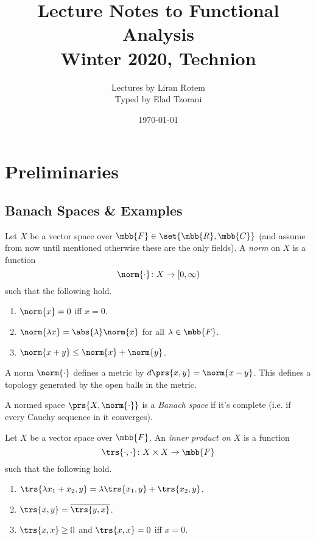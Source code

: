\documentclass[10pt, twoside]{book}
\title{Lecture Notes to Functional Analysis \\ \large{Winter 2020, Technion}}
\author{Lectures by Liran Rotem \\ \small{Typed by Elad Tzorani}}
\date{\today}
\begin{document}
\maketitle
\tableofcontents

\chapter{Preliminaries}

\section{Banach Spaces \& Examples}

\begin{definition}[Norm]
Let $X$ be a vector space over $\mbb{F} \in \set{\mbb{R}, \mbb{C}}$ (and assume from now until mentioned otherwise these are the only fields).
A \emph{norm} on $X$ is a function
\[\norm{\cdot} \colon X \to \left[0, \infty \right)\]
such that the following hold.
\begin{enumerate}
\item $\norm{x} = 0$ iff $x = 0$.
\item $\norm{\lambda x} = \abs{\lambda} \norm{x}$ for all $\lambda \in \mbb{F}$.
\item $\norm{x+y} \leq \norm{x} + \norm{y}$.
\end{enumerate}
\end{definition}

\begin{remark}
A norm $\norm{\cdot}$ defines a metric by $d\prs{x,y} = \norm{x-y}$. This defines a topology generated by the open balls in the metric.
\end{remark}

\begin{definition}
A normed space $\prs{X, \norm{\cdot}}$ is a \emph{Banach space} if it's complete (i.e. if every Cauchy sequence in it converges).
\end{definition}

\begin{definition}
Let $X$ be a vector space over $\mbb{F}$.
An \emph{inner product on $X$} is a function
\[\trs{\cdot, \cdot} \colon X \times X \to \mbb{F}\]
such that the following hold.
\begin{enumerate}
\item $\trs{\lambda x_1 + x_2, y} = \lambda \trs{x_1, y} + \trs{x_2, y}$.
\item $\trs{x,y} = \overline{\trs{y,x}}$.
\item $\trs{x,x} \geq 0$ and $\trs{x,x} = 0$ iff $x = 0$.
\end{enumerate}
\end{definition}
\end{document}
